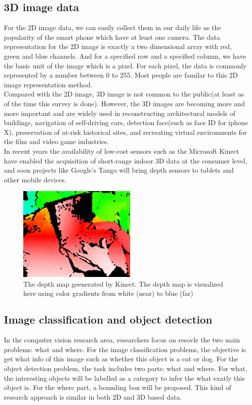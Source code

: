 \documentclass[a4paper,12pt]{article}
\begin{document}
\subsection{3D image data}
For the 2D image data, we can easily collect them in our daily life as the popularity of the smart phone which have at least one camera. The data representation for the 2D image is exactly a two dimensional array with red, green and blue channels. And for a specified row and a specified column, we have the basic unit of the image which is a pixel. For each pixel, the data is commonly represented by a number between 0 to 255. Most people are familar to this 2D image representation method.\\
Compared with the 2D image, 3D image is not common to the public(at least as of the time this survey is done). However, the 3D images are becoming more and more important and are widely used in reconstructing architectural models of buildings, navigation of self-driving cars, detection face(such as face ID for iphone X), preservation of at-risk historical sites, and recreating virtual environments for the film and video game industries.\\
In recent years the availability of low-cost sensors such as the Microsoft Kinect
have enabled the acquisition of short-range indoor 3D data at the consumer
level, and soon projects like Google’s Tango will bring depth sensors to tablets
and other mobile devices.


\begin{figure}[H]
  \begin{center}
      \includegraphics[scale=0.6]{Kinect2-deepmap.png}
\end{center}
\caption{The depth map geenerated by Kinect. The depth map is visualized here using color gradients from white (near) to blue (far)\cite{kinect}}
 \label{fig:kinect}
 \end{figure}

\subsection{Image classification and object detection}
In the computer vision research area, researchers focus on resovle the two main problems: what and where. For the image classification problems, the objective is get what info of this image such as whether this object is a cat or dog. For the object detection problem, the task includes two parts: what and where. For what, the interesting objects will be labelled as a category to infer the what exatly this object is. For the where part, a bounding box will be proposed. This kind of research approach is similar in both 2D and 3D based data.
\end{document}

